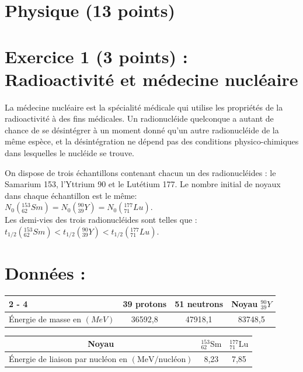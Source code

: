 \section*{Physique (13 points)}
\section*{Exercice 1 (3 points) : Radioactivité et médecine nucléaire}
La médecine nucléaire est la spécialité médicale qui utilise les propriétés de la radioactivité à des fins médicales. Un radionucléide quelconque a autant de chance de se désintégrer à un moment donné qu'un autre radionucléide de la même espèce, et la désintégration ne dépend pas des conditions physico-chimiques dans lesquelles le nucléide se trouve.

On dispose de trois échantillons contenant chacun un des radionucléides : le Samarium 153, l'Yttrium 90 et le Lutétium 177. Le nombre initial de noyaux dans chaque échantillon est le même:\\
$N_{0}\left({ }_{62}^{153} S m\right)=N_{0}\left({ }_{39}^{90} Y\right)=N_{0}\left({ }_{71}^{177} L u\right)$.\\
Les demi-vies des trois radionucléides sont telles que : $t_{1 / 2}\left({ }_{62}^{153} S m\right)<t_{1 / 2}\left({ }_{39}^{90} Y\right)<t_{1 / 2}\left({ }_{71}^{177} L u\right)$.

\section*{Données :}
\begin{center}
\begin{tabular}{|l|c|c|c|}
\cline { 2 - 4 }
\multicolumn{1}{c|}{} & 39 protons & 51 neutrons & Noyau ${ }_{39}^{90} Y$ \\
\hline
Énergie de masse en $(M e V)$ & 36592,8 & 47918,1 & 83748,5 \\
\hline
\end{tabular}
\end{center}

\begin{center}
\begin{tabular}{|c|c|c|}
\hline
Noyau & ${ }_{62}^{153} \mathrm{Sm}$ & ${ }_{71}^{177} \mathrm{Lu}$ \\
\hline
Énergie de liaison par nucléon en $(\mathrm{MeV} / \mathrm{nucléon})$ & 8,23 & 7,85 \\
\hline
\end{tabular}
\end{center}

